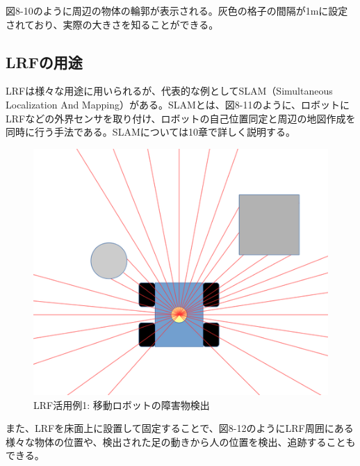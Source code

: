 図8-10のように周辺の物体の輪郭が表示される。灰色の格子の間隔が1mに設定されており、実際の大きさを知ることができる。

\subsection{LRFの用途}

LRFは様々な用途に用いられるが、代表的な例としてSLAM（Simultaneous Localization And Mapping）がある。SLAMとは、図8-11のように、ロボットにLRFなどの外界センサを取り付け、ロボットの自己位置同定と周辺の地図作成を同時に行う手法である。SLAMについては10章で詳しく説明する。

\begin{figure}[ht]
  \centering
  \includegraphics[width=\columnwidth]{pictures/chapter8/pic_08_11.png}
  \caption{LRF活用例1: 移動ロボットの障害物検出}
\end{figure}

また、LRFを床面上に設置して固定することで、図8-12のようにLRF周囲にある様々な物体の位置や、検出された足の動きから人の位置を検出、追跡することもできる。

